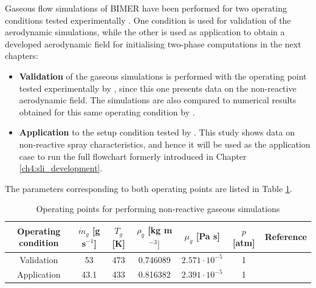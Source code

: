Gaseous flow simulations of BIMER have been performed for two operating conditions tested experimentally . One condition is used for validation of the aerodynamic simulations, while the other is used as application to obtain a developed aerodynamic field for initialising two-phase computations in the next chapters:

\begin{itemize}

	\item \textbf{Validation} of the gaseous simulations is performed with the operating point tested experimentally by , since this one presents data on the non-reactive aerodynamic field. The simulations are also compared to numerical results obtained for this same operating condition by . 
	
	\item \textbf{Application} to the setup condition tested by . This study shows data on non-reactive spray characteristics, and hence it will be used as the application case to run the full flowchart formerly introduced in Chapter \ref{ch4:sli_development}. %

\end{itemize}

The parameters corresponding to both operating points are listed in Table \ref{tab:gaseous_operating_points_BIMER}. 

\begin{table}[!h]
\centering
\caption{Operating points for performing non-reactive gaseous simulations}
\begin{tabular}{|c|c|c|c|c|c|c|}
\hline
Operating condition    & $\dot{m}_g$ [g s$^{-1}$] & $T_g$ [K] & $\rho_g$ [kg m$^{-3}]$  & $\mu_g$ [Pa s] & $p$ [atm]  & Reference\\
\hline
\hline
Validation &   53 & 473 & 0.746089 & $2.571 \cdot 10^{-5}$ & 1 & \\
\hline
Application  & 43.1 & 433 & 0.816382 & $2.391 \cdot 10^{-5}$ & 1 &  \\
\hline
\end{tabular}
\label{tab:gaseous_operating_points_BIMER}
\end{table}



